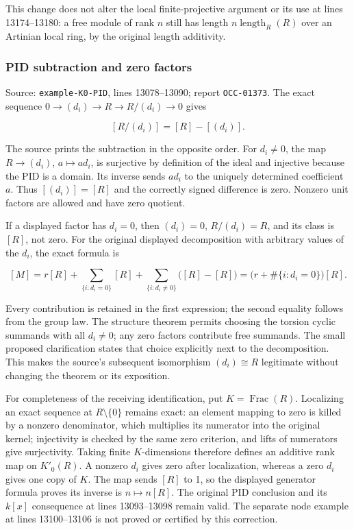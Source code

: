 This change does not alter the local finite-projective argument or its use at lines 13174--13180: a free module of rank \(n\) still has length \(n\operatorname{length}_R(R)\) over an Artinian local ring, by the original length additivity.

\subsubsection{PID subtraction and zero factors}\label{algebra-proof-001-pid-subtraction-and-zero-factors}

Source: \texttt{example-K0-PID}, lines 13078--13090; report \texttt{OCC-01373}. The exact sequence \(0\to(d_i)\to R\to R/(d_i)\to0\) gives

\[
[R/(d_i)]=[R]-[(d_i)].
\]

The source prints the subtraction in the opposite order. For \(d_i\ne0\), the map \(R\to(d_i)\), \(a\mapsto ad_i\), is surjective by definition of the ideal and injective because the PID is a domain. Its inverse sends \(ad_i\) to the uniquely determined coefficient \(a\). Thus \([(d_i)]=[R]\) and the correctly signed difference is zero. Nonzero unit factors are allowed and have zero quotient.

If a displayed factor has \(d_i=0\), then \((d_i)=0\), \(R/(d_i)=R\), and its class is \([R]\), not zero. For the original displayed decomposition with arbitrary values of the \(d_i\), the exact formula is

\[
[M]=r[R]+\sum_{\{i:d_i=0\}}[R]
       +\sum_{\{i:d_i\ne0\}}\bigl([R]-[R]\bigr)
     =\bigl(r+\#\{i:d_i=0\}\bigr)[R].
\]

Every contribution is retained in the first expression; the second equality follows from the group law. The structure theorem permits choosing the torsion cyclic summands with all \(d_i\ne0\); any zero factors contribute free summands. The small proposed clarification states that choice explicitly next to the decomposition. This makes the source's subsequent isomorphism \((d_i)\cong R\) legitimate without changing the theorem or its exposition.

For completeness of the receiving identification, put \(K=\operatorname{Frac}(R)\). Localizing an exact sequence at \(R\setminus\{0\}\) remains exact: an element mapping to zero is killed by a nonzero denominator, which multiplies its numerator into the original kernel; injectivity is checked by the same zero criterion, and lifts of numerators give surjectivity. Taking finite \(K\)-dimensions therefore defines an additive rank map on \(K'_0(R)\). A nonzero \(d_i\) gives zero after localization, whereas a zero \(d_i\) gives one copy of \(K\). The map sends \([R]\) to 1, so the displayed generator formula proves its inverse is \(n\mapsto n[R]\). The original PID conclusion and its \(k[x]\) consequence at lines 13093--13098 remain valid. The separate node example at lines 13100--13106 is not proved or certified by this correction.

